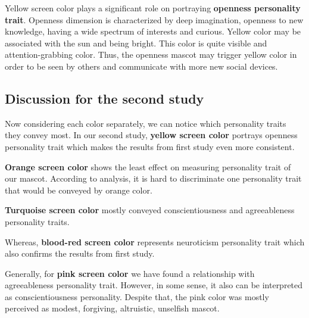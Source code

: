 \par Yellow screen color plays a significant role on portraying \textbf{openness personality trait}.
Openness dimension is characterized by deep imagination, openness to new knowledge,
having a wide spectrum of interests and curious.
Yellow color may be associated with the sun and being bright.
This color is quite visible and attention-grabbing color.
Thus, the openness mascot may trigger yellow color in order to be seen by others and
communicate with more new social devices.

\subsection{Discussion for the second study}
\label{subsec:discussion-for-the-second-study4}

Now considering each color separately, we can notice which personality traits they convey most.
In our second study, \textbf{yellow screen color} portrays openness personality
trait which makes the results from first study even more consistent.

\textbf{Orange screen color} shows the least effect on measuring personality trait of our mascot.
According to analysis, it is hard to discriminate one personality trait that would be conveyed by orange color.

\textbf{Turquoise screen color} mostly conveyed conscientiousness and agreeableness personality traits.

Whereas, \textbf{blood-red screen color} represents neuroticism personality trait which also confirms
the results from first study.

Generally, for \textbf{pink screen color} we have found a relationship with agreeableness personality trait.
However, in some sense, it also can be interpreted as conscientiousness personality.
Despite that, the pink color was mostly perceived as modest, forgiving, altruistic, unselfish mascot.
